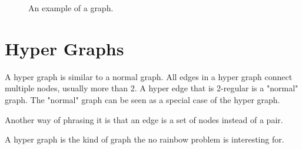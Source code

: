 \documentclass[msc,lith,english]{liuthesis}
\begin{document}
\begin{center}
\begin{figure}[h]
\centering
{}
  \caption{An example of a graph.}
  \label{figGraphExample}
\end{figure}
\end{center}

\cite[Chapter 1]{sourceDiestel}
\cite[Chapter 1]{sourceGWA}
\cite[Section 9.1]{sourceArmen}


\section{Hyper Graphs}
A hyper graph is similar to a normal graph.
All edges in a hyper graph connect multiple nodes, usually more than 2.
A hyper edge that is 2-regular is a "normal" graph.
The "normal" graph can be seen as a special case of the hyper graph.

Another way of phrasing it is that an edge is a set of nodes instead of a pair.

A hyper graph is the kind of graph the no rainbow problem is interesting for.
\end{document}
